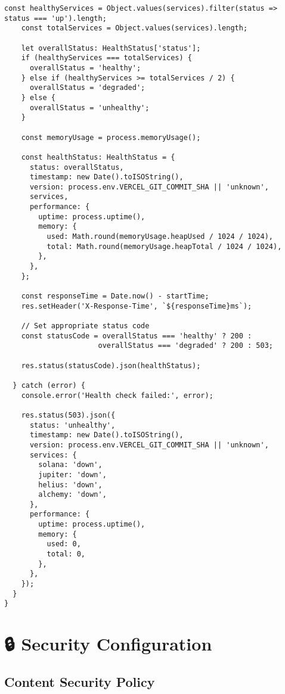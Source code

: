 \documentclass[11pt,a4paper]{article}
\begin{document}
\begin{lstlisting}[style=bash, caption=pages/api/health.ts]
    const healthyServices = Object.values(services).filter(status => status === 'up').length;
    const totalServices = Object.values(services).length;
    
    let overallStatus: HealthStatus['status'];
    if (healthyServices === totalServices) {
      overallStatus = 'healthy';
    } else if (healthyServices >= totalServices / 2) {
      overallStatus = 'degraded';
    } else {
      overallStatus = 'unhealthy';
    }
    
    const memoryUsage = process.memoryUsage();
    
    const healthStatus: HealthStatus = {
      status: overallStatus,
      timestamp: new Date().toISOString(),
      version: process.env.VERCEL_GIT_COMMIT_SHA || 'unknown',
      services,
      performance: {
        uptime: process.uptime(),
        memory: {
          used: Math.round(memoryUsage.heapUsed / 1024 / 1024),
          total: Math.round(memoryUsage.heapTotal / 1024 / 1024),
        },
      },
    };
    
    const responseTime = Date.now() - startTime;
    res.setHeader('X-Response-Time', `${responseTime}ms`);
    
    // Set appropriate status code
    const statusCode = overallStatus === 'healthy' ? 200 : 
                      overallStatus === 'degraded' ? 200 : 503;
    
    res.status(statusCode).json(healthStatus);
    
  } catch (error) {
    console.error('Health check failed:', error);
    
    res.status(503).json({
      status: 'unhealthy',
      timestamp: new Date().toISOString(),
      version: process.env.VERCEL_GIT_COMMIT_SHA || 'unknown',
      services: {
        solana: 'down',
        jupiter: 'down',
        helius: 'down',
        alchemy: 'down',
      },
      performance: {
        uptime: process.uptime(),
        memory: {
          used: 0,
          total: 0,
        },
      },
    });
  }
}
\end{lstlisting}

\section{🔒 Security Configuration}

\subsection{Content Security Policy}
\end{document}
